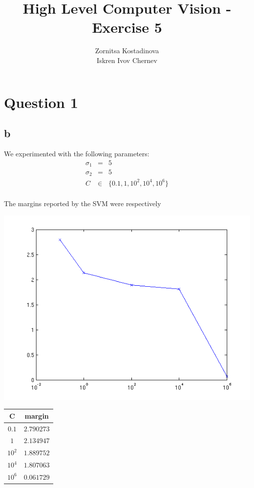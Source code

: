 \documentclass[a4paper]{article}
\begin{document}
\title{High Level Computer Vision - Exercise 5}
\author{Zornitsa Kostadinova \\ Iskren Ivov Chernev}
\maketitle

\section*{Question 1}
\subsection*{b}
We experimented with the following parameters:
\begin{eqnarray*}
\sigma_1 &=& 5 \\
\sigma_2 &=& 5 \\
C &\in& \{ 0.1, 1, 10^2, 10^4, 10^6 \} \\
\end{eqnarray*}

The margins reported by the SVM were respectively

\includegraphics[scale=0.5]{margin_vs_c.png}

\begin{tabular}{|c|c|}
\hline
C   & margin \\ \hline \hline
$ 0.1 $ & $ 2.790273 $ \\
$ 1 $ & $ 2.134947 $ \\
$ 10^2 $ & $ 1.889752 $ \\
$ 10^4 $ & $ 1.807063 $ \\
$ 10^6 $ & $ 0.061729 $ \\ \hline
\end{tabular}
\end{document}

